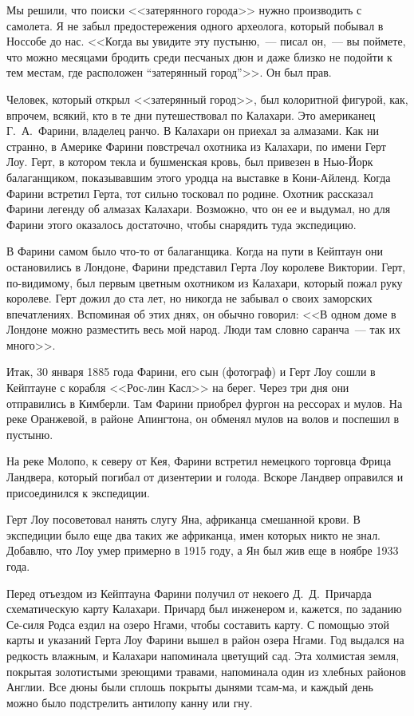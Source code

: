 \documentclass[12pt,a4paper,twoside,openany,svgnames]{memoir}
\begin{document}
Мы решили, что поиски <<затерянного города>> нужно производить с самолета. Я не забыл предостережения одного археолога, который побывал в Носсобе до нас. <<Когда вы увидите эту пустыню,~--- писал он,~--- вы поймете, что можно месяцами бродить среди песчаных дюн и даже близко не подойти к тем местам, где расположен ``затерянный город''>>. Он был прав.

Человек, который открыл <<затерянный город>>, был колоритной фигурой, как, впрочем, всякий, кто в те дни путешествовал по Калахари. Это американец Г.~А.~Фарини, владелец ранчо. В Калахари он приехал за алмазами. Как ни странно, в Америке Фарини повстречал охотника из Калахари, по имени Герт Лоу. Герт, в котором текла и бушменская кровь, был привезен в Нью-Йорк балаганщиком, показывавшим этого уродца на выставке в Кони-Айленд. Когда Фарини встретил Герта, тот сильно тосковал по родине. Охотник рассказал Фарини легенду об алмазах Калахари. Возможно, что он ее и выдумал, но для Фарини этого оказалось достаточно, чтобы снарядить туда экспедицию.

В Фарини самом было что-то от балаганщика. Когда на пути в Кейптаун они остановились в Лондоне, Фарини представил Герта Лоу королеве Виктории. Герт, по-видимому, был первым цветным охотником из Калахари, который пожал руку королеве. Герт дожил до ста лет, но никогда не забывал о своих заморских впечатлениях. Вспоминая об этих днях, он обычно говорил: <<В одном доме в Лондоне можно разместить весь мой народ. Люди там словно саранча~--- так их много>>.

Итак, 30 января 1885 года Фарини, его сын (фотограф) и Герт Лоу сошли в Кейптауне с корабля <<Рос-лин Касл>> на берег. Через три дня они отправились в Кимберли. Там Фарини приобрел фургон на рессорах и мулов. На реке Оранжевой, в районе Апингтона, он обменял мулов на волов и поспешил в пустыню.

На реке Молопо, к северу от Кея, Фарини встретил немецкого торговца Фрица Ландвера, который погибал от дизентерии и голода. Вскоре Ландвер оправился и присоединился к экспедиции.

Герт Лоу посоветовал нанять слугу Яна, африканца смешанной крови. В экспедиции было еще два таких же африканца, имен которых никто не знал. Добавлю, что Лоу умер примерно в 1915 году, а Ян был жив еще в ноябре 1933 года.

Перед отъездом из Кейптауна Фарини получил от некоего Д.~Д.~Причарда схематическую карту Калахари. Причард был инженером и, кажется, по заданию Се-силя Родса ездил на озеро Нгами, чтобы составить карту. С помощью этой карты и указаний Герта Лоу Фарини вышел в район озера Нгами. Год выдался на редкость влажным, и Калахари напоминала цветущий сад. Эта холмистая земля, покрытая золотистыми зреющими травами, напоминала один из хлебных районов Англии. Все дюны были сплошь покрыты дынями тсам-ма, и каждый день можно было подстрелить антилопу канну или гну.
\end{document}
